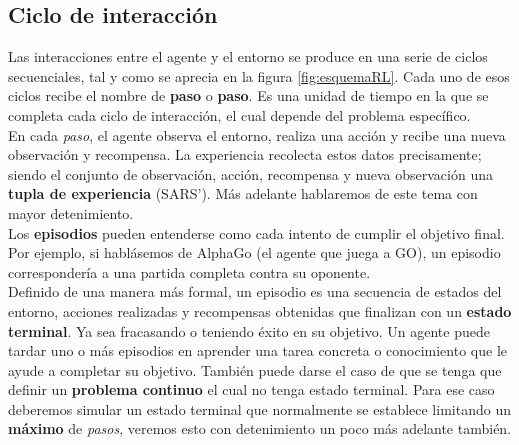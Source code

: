\documentclass[11pt,fleqn]{book} %
\begin{document}

\subsection{Ciclo de interacción}\label{sec:episodios}


Las interacciones entre el agente y el entorno se produce en una serie de ciclos secuenciales, tal y como se aprecia en la figura \ref{fig:esquemaRL}. Cada uno de esos ciclos recibe el nombre de \textbf{paso} o \textbf{paso}. Es una unidad de tiempo en la que se completa cada ciclo de interacción, el cual depende del problema específico. \\

En cada \textit{paso}, el agente observa el entorno, realiza una acción y recibe una nueva observación y recompensa. La experiencia recolecta estos datos precisamente; siendo el conjunto de observación, acción, recompensa y nueva observación una \textbf{tupla de experiencia} (SARS'). Más adelante hablaremos de este tema con mayor detenimiento. \\

Los \textbf{episodios} pueden entenderse como cada intento de cumplir el objetivo final. Por ejemplo, si hablásemos de AlphaGo (el agente que juega a GO), un episodio correspondería a una partida completa contra su oponente. \\

Definido de una manera más formal, un episodio es una secuencia de estados del entorno, acciones realizadas y recompensas obtenidas que finalizan con un \textbf{estado terminal}. Ya sea fracasando o teniendo éxito en su objetivo. Un agente puede tardar uno o más episodios en aprender una tarea concreta o conocimiento que le ayude a completar su objetivo. También puede darse el caso de que se tenga que definir un \textbf{problema continuo} el cual no tenga estado terminal. Para ese caso deberemos simular un estado terminal que normalmente se establece limitando un \textbf{máximo} de \textit{pasos}, veremos esto con detenimiento un poco más adelante también. \\
\end{document}
